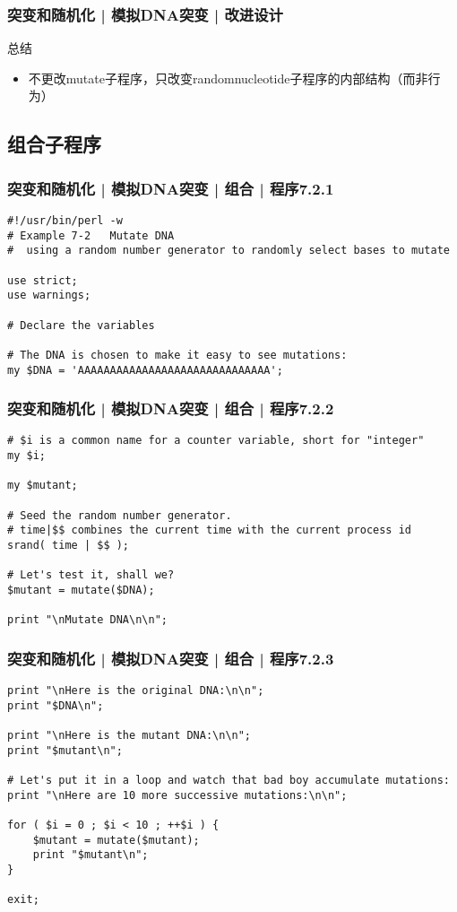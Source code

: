 \begin{frame}[fragile]
  \frametitle{突变和随机化 | 模拟DNA突变 | 改进设计}
  \begin{block}{总结}
    \begin{itemize}
      \item 不更改mutate子程序，只改变randomnucleotide子程序的内部结构（而非行为）
    \end{itemize}
  \end{block}
\end{frame}

\subsection{组合子程序}
\begin{frame}[fragile]
  \frametitle{突变和随机化 | 模拟DNA突变 | 组合 | 程序7.2.1}
  \vspace{-1.5em}
\begin{lstlisting}[firstnumber=1]
#!/usr/bin/perl -w
# Example 7-2   Mutate DNA
#  using a random number generator to randomly select bases to mutate

use strict;
use warnings;

# Declare the variables

# The DNA is chosen to make it easy to see mutations:
my $DNA = 'AAAAAAAAAAAAAAAAAAAAAAAAAAAAAA';
\end{lstlisting}
\end{frame}

\begin{frame}[fragile]
  \frametitle{突变和随机化 | 模拟DNA突变 | 组合 | 程序7.2.2}
  \vspace{-1.5em}
\begin{lstlisting}[firstnumber=13]
# $i is a common name for a counter variable, short for "integer"
my $i;

my $mutant;

# Seed the random number generator.
# time|$$ combines the current time with the current process id
srand( time | $$ );

# Let's test it, shall we?
$mutant = mutate($DNA);

print "\nMutate DNA\n\n";
\end{lstlisting}
\end{frame}

\begin{frame}[fragile]
  \frametitle{突变和随机化 | 模拟DNA突变 | 组合 | 程序7.2.3}
  \vspace{-1.5em}
\begin{lstlisting}[firstnumber=27,basicstyle=\small\tt,numberstyle=\footnotesize]
print "\nHere is the original DNA:\n\n";
print "$DNA\n";

print "\nHere is the mutant DNA:\n\n";
print "$mutant\n";

# Let's put it in a loop and watch that bad boy accumulate mutations:
print "\nHere are 10 more successive mutations:\n\n";

for ( $i = 0 ; $i < 10 ; ++$i ) {
    $mutant = mutate($mutant);
    print "$mutant\n";
}

exit;
\end{lstlisting}
\end{frame}

